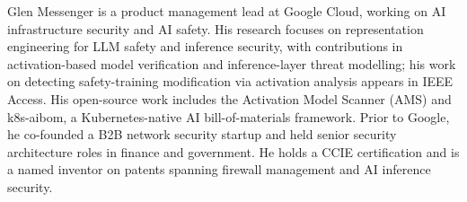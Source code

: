 \documentclass{ieeeaccess}
\begin{document}


















\begin{IEEEbiographynophoto}{Glen Messenger}
is a product management lead at Google Cloud, working on AI infrastructure security and AI safety. His research
focuses on representation engineering for LLM safety and inference security, with contributions in activation-based
model verification and inference-layer threat modelling; his work on detecting safety-training modification via
activation analysis appears in IEEE Access. His open-source work includes the Activation Model Scanner (AMS) and
k8s-aibom, a Kubernetes-native AI bill-of-materials framework. Prior to Google, he co-founded a B2B network security
startup and held senior security architecture roles in finance and government. He holds a CCIE certification and is a
named inventor on patents spanning firewall management and AI inference security.
\end{IEEEbiographynophoto}

\EOD
\end{document}
